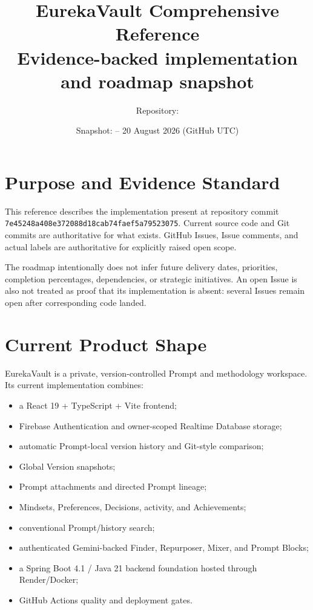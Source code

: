 \documentclass[11pt]{article}
\title{\textbf{EurekaVault Comprehensive Reference}\\\large Evidence-backed implementation and roadmap snapshot}
\author{Repository: \code{kirolossedra/Prompt-management}}
\date{Snapshot: \commit{7e45248} -- 20 August 2026 (GitHub UTC)}
\newcommand{\commit}[1]{\texttt{#1}}
\begin{document}
\maketitle
\tableofcontents
\newpage

\section{Purpose and Evidence Standard}

This reference describes the implementation present at repository commit
\commit{7e45248a408e372088d18cab74faef5a79523075}. Current source code and Git
commits are authoritative for what exists. GitHub Issues, Issue comments, and
actual labels are authoritative for explicitly raised open scope.

The roadmap intentionally does not infer future delivery dates, priorities,
completion percentages, dependencies, or strategic initiatives. An open Issue
is also not treated as proof that its implementation is absent: several Issues
remain open after corresponding code landed.

\section{Current Product Shape}

EurekaVault is a private, version-controlled Prompt and methodology workspace.
Its current implementation combines:

\begin{itemize}
  \item a React 19 + TypeScript + Vite frontend;
  \item Firebase Authentication and owner-scoped Realtime Database storage;
  \item automatic Prompt-local version history and Git-style comparison;
  \item Global Version snapshots;
  \item Prompt attachments and directed Prompt lineage;
  \item Mindsets, Preferences, Decisions, activity, and Achievements;
  \item conventional Prompt/history search;
  \item authenticated Gemini-backed Finder, Repurposer, Mixer, and Prompt Blocks;
  \item a Spring Boot 4.1 / Java 21 backend foundation hosted through Render/Docker;
  \item GitHub Actions quality and deployment gates.
\end{itemize}
\end{document}
